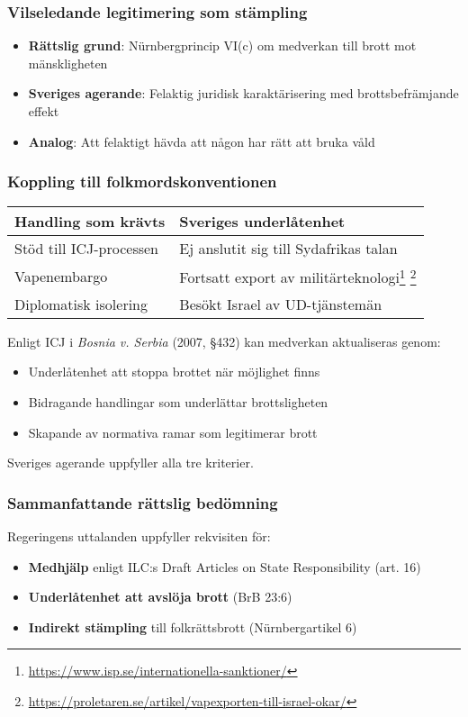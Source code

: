 \subsubsection{Vilseledande legitimering som stämpling}
\begin{itemize}
\item \textbf{Rättslig grund}: Nürnbergprincip VI(c) om medverkan till brott mot mänskligheten
\item \textbf{Sveriges agerande}: Felaktig juridisk karaktärisering med brottsbefrämjande effekt
\item \textbf{Analog}: Att felaktigt hävda att någon har rätt att bruka våld
\end{itemize}

\subsubsection{Koppling till folkmordskonventionen}

\begin{tabular}{p{}p{}}
\textbf{Handling som krävts} & \textbf{Sveriges underlåtenhet} \\
\hline
Stöd till ICJ-processen & Ej anslutit sig till Sydafrikas talan \\
\hline
Vapenembargo & Fortsatt export av militärteknologi\footnote{\url{https://www.isp.se/internationella-sanktioner/}} \footnote{\url{https://proletaren.se/artikel/vapexporten-till-israel-okar/}} \\
\hline
Diplomatisk isolering & Besökt Israel av UD-tjänstemän \\
\end{tabular}



Enligt ICJ i \textit{Bosnia v. Serbia} (2007, §432) kan medverkan aktualiseras genom:
\begin{itemize}
\item Underlåtenhet att stoppa brottet när möjlighet finns
\item Bidragande handlingar som underlättar brottsligheten
\item Skapande av normativa ramar som legitimerar brott
\end{itemize}
Sveriges agerande uppfyller alla tre kriterier.



\subsubsection{Sammanfattande rättslig bedömning}
Regeringens uttalanden uppfyller rekvisiten för:
\begin{itemize}
\item \textbf{Medhjälp} enligt ILC:s Draft Articles on State Responsibility (art. 16)
\item \textbf{Underlåtenhet att avslöja brott} (BrB 23:6)
\item \textbf{Indirekt stämpling} till folkrättsbrott (Nürnbergartikel 6)
\end{itemize}
